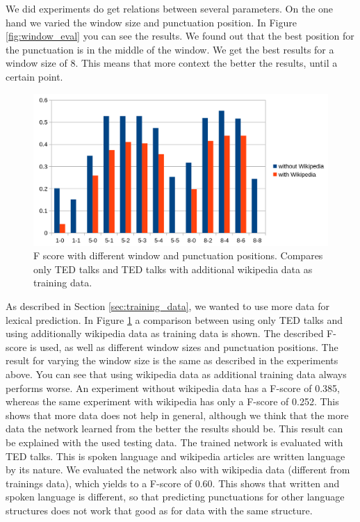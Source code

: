 We did experiments do get relations between several parameters.
On the one hand we varied the window size and punctuation position.
In Figure \ref{fig:window_eval} you can see the results.
We found out that the best position for the punctuation is in the middle of the window.
We get the best results for a window size of 8.
This means that more context the better the results, until a certain point.

\begin{figure}[ht]
    \centering
    \includegraphics[width=\textwidth]{img/window_wiki_eval.png}
    \caption{F score with different window and punctuation positions. Compares only TED talks and TED talks with additional wikipedia data as training data.}
    \label{fig:window_wiki_eval}
\end{figure}

As described in Section \ref{sec:training_data}, we wanted to use more data for lexical prediction.
In Figure \ref{fig:window_wiki_eval} a comparison between using only TED talks and using additionally wikipedia data as training data is shown.
The described F-score is used, as well as different window sizes and punctuation positions.
The result for varying the window size is the same as described in the experiments above.
You can see that using wikipedia data as additional training data always performs worse.
An experiment without wikipedia data has a F-score of 0.385, whereas the same experiment with wikipedia has only a F-score of 0.252.
This shows that more data does not help in general, although we think that the more data the network learned from the better the results should be.
This result can be explained with the used testing data.
The trained network is evaluated with TED talks.
This is spoken language and wikipedia articles are written language by its nature.
We evaluated the network also with wikipedia data (different from trainings data), which yields to a F-score of 0.60.
This shows that written and spoken language is different, so that predicting punctuations for other language structures does not work that good as for data with the same structure.

